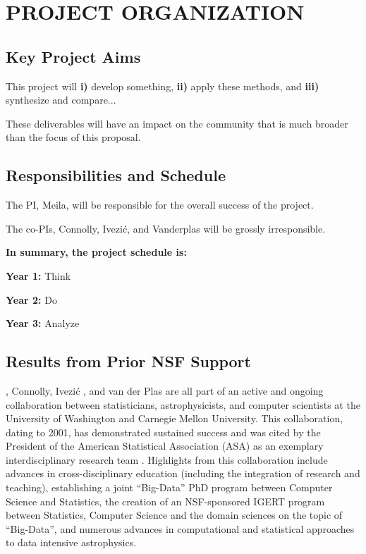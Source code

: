 
\section{    {\bf        PROJECT ORGANIZATION         }}
\label{plan}

\subsection{                      Key Project Aims                   }
 
This project will  {\bf i)}  develop something, {\bf ii)} 
apply these methods, and {\bf iii)}  synthesize and compare...

These deliverables will have an impact on the community that is much broader 
than the focus of this proposal. 


\subsection{Responsibilities and Schedule}

The PI, Meila, will be responsible for the overall success of the project.


The co-PIs, Connolly, Ivezi\'{c}, and Vanderplas will be grossly irresponsible. 


{\bf In summary, the project schedule is:}

{\bf Year 1:}
Think

{\bf Year 2:}
Do

{\bf Year 3:}
Analyze


\subsection{             Results from Prior NSF Support             }
\label{sec:priorNSF}

\meila, Connolly, Ivezi\'{c} , and van der Plas are all part of an active
and ongoing collaboration between statisticians, astrophysicists, and
computer scientists at the University of Washington and Carnegie
Mellon University.  This collaboration, dating to 2001, has
demonstrated sustained success and was cited by the President of the
American Statistical Association (ASA) as an exemplary
interdisciplinary research team \cite{straf03}. Highlights from this
collaboration include advances in cross-disciplinary education
(including the integration of research and teaching), establishing a
joint ``Big-Data'' PhD program between Computer Science and
Statistics, the creation of an NSF-sponsored IGERT program between
Statistics, Computer Science and the domain sciences on the topic of
``Big-Data'', and numerous advances in computational and statistical
approaches to data intensive astrophysics.

